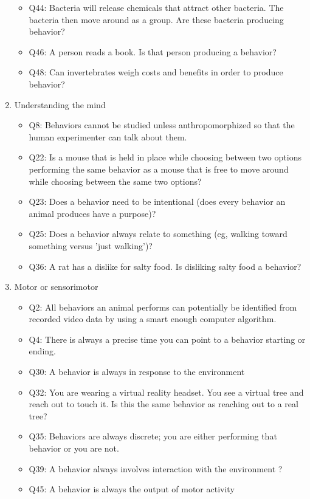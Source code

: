 \begin{enumerate}
\begin{itemize}[label={}]
\item Q44: Bacteria will release chemicals that attract other bacteria. The bacteria then move around as a group. Are these bacteria producing behavior?
\item Q46: A person reads a book. Is that person producing a behavior?
\item Q48: Can invertebrates weigh costs and benefits in order to produce behavior?
\end{itemize}
 \item Understanding the mind
\begin{itemize}[label={}]
\item Q8: Behaviors cannot be studied unless anthropomorphized so that the human experimenter can talk about them.
\item Q22: Is a mouse that is held in place while choosing between two options performing the same behavior as a mouse that is free to move around while choosing between the same two options?
\item Q23: Does a behavior need to be intentional (does every behavior an animal produces have a purpose)?
\item Q25: Does a behavior always relate to something (eg, walking toward something versus 'just walking')?
\item Q36: A rat has a dislike for salty food. Is disliking salty food a behavior?
\end{itemize}
 \item Motor or sensorimotor
\begin{itemize}[label={}]
\item Q2: All behaviors an animal performs can potentially be identified from recorded video data by using a smart enough computer algorithm.
\item Q4: There is always a precise time you can point to a behavior starting or ending.
\item Q30: A behavior is always in response to the environment
\item Q32: You are wearing a virtual reality headset. You see a virtual tree and reach out to touch it. Is this the same behavior as reaching out to a real tree?
\item Q35: Behaviors are always discrete; you are either performing that behavior or you are not.
\item Q39: A behavior always involves interaction with the environment ?
\item Q45: A behavior is always the output of motor activity
\end{itemize}

\end{enumerate}
